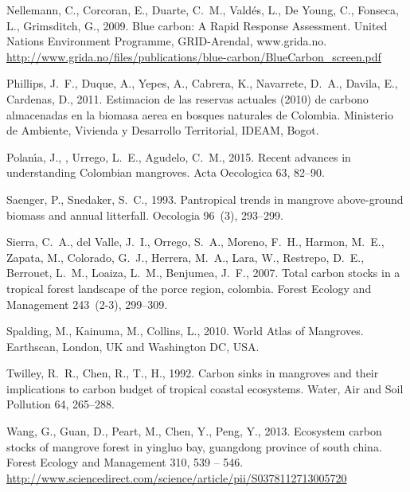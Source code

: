 \documentclass[review, authoryear]{elsarticle}   	%
\begin{document}
\begin{thebibliography}{51}
Nellemann, C., Corcoran, E., Duarte, C.~M., Vald{\'e}s, L., {De Young}, C.,
  Fonseca, L., Grimsditch, G., 2009. {Blue carbon: A Rapid Response
  Assessment.} United Nations Environment Programme, GRID-Arendal,
  www.grida.no.
\newline\urlprefix\url{http://www.grida.no/files/publications/blue-carbon/BlueCarbon\_screen.pdf}

Phillips, J.~F., Duque, A., Yepes, A., Cabrera, K., Navarrete, D.~A., Davila,
  E., Cardenas, D., 2011. {Estimacion de las reservas actuales (2010) de
  carbono almacenadas en la biomasa aerea en bosques naturales de Colombia}.
  Ministerio de Ambiente, Vivienda y Desarrollo Territorial, IDEAM, Bogot.

Polan\'{\i}a, J., , Urrego, L.~E., Agudelo, C.~M., 2015. {Recent advances in
  understanding Colombian mangroves}. Acta Oecologica 63, 82--90.

Saenger, P., Snedaker, S.~C., 1993. {Pantropical trends in mangrove
  above-ground biomass and annual litterfall}. Oecologia 96~(3), 293--299.

Sierra, C.~A., del Valle, J.~I., Orrego, S.~A., Moreno, F.~H., Harmon, M.~E.,
  Zapata, M., Colorado, G.~J., Herrera, M.~A., Lara, W., Restrepo, D.~E.,
  Berrouet, L.~M., Loaiza, L.~M., Benjumea, J.~F., 2007. Total carbon stocks in
  a tropical forest landscape of the porce region, colombia. Forest Ecology and
  Management 243~(2-3), 299--309.

Spalding, M., Kainuma, M., Collins, L., 2010. World Atlas of Mangroves.
  Earthscan, London, UK and Washington DC, USA.

Twilley, R.~R., Chen, R., T., H., 1992. {Carbon sinks in mangroves and their
  implications to carbon budget of tropical coastal ecosystems}. Water, Air and
  Soil Pollution 64, 265--288.

Wang, G., Guan, D., Peart, M., Chen, Y., Peng, Y., 2013. Ecosystem carbon
  stocks of mangrove forest in yingluo bay, guangdong province of south china.
  Forest Ecology and Management 310, 539 -- 546.
\newline\urlprefix\url{http://www.sciencedirect.com/science/article/pii/S0378112713005720}


\end{thebibliography}
\end{document}
